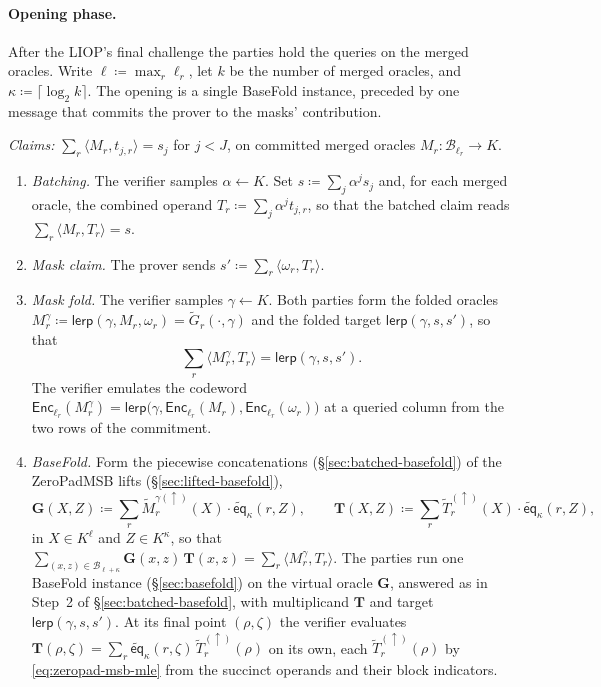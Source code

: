 \documentclass{article}
\theoremstyle{definition}
\newcommand*{\mle}{\widetilde}
\newcommand{\eq}{\mathsf{eq}}
\newcommand{\BB}{\mathcal{B}}
\begin{document}
\paragraph{Opening phase.}
After the LIOP's final challenge the parties hold the queries on the merged oracles. Write $\boldsymbol{\ell} \coloneqq \max_r \ell_r$, let $k$ be the number of merged oracles, and $\kappa \coloneqq \lceil \log_2 k \rceil$. The opening is a single BaseFold instance, preceded by one message that commits the prover to the masks' contribution.

\begin{protocol}
\label{prot:batched-zk-basefold}
\emph{Claims:} $\sum_r \langle M_r, t_{j, r} \rangle = s_j$ for $j < J$, on committed merged oracles $M_r \colon \BB_{\ell_r} \to K$.
\begin{enumerate}
\item \emph{Batching.} The verifier samples $\alpha \gets K$. Set $s \coloneqq \sum_j \alpha^j s_j$ and, for each merged oracle, the combined operand $T_r \coloneqq \sum_j \alpha^j t_{j, r}$, so that the batched claim reads $\sum_r \langle M_r, T_r \rangle = s$.
\item \emph{Mask claim.} The prover sends $s' \coloneqq \sum_r \langle \omega_r, T_r \rangle$.
\item \emph{Mask fold.} The verifier samples $\gamma \gets K$. Both parties form the folded oracles $M^\gamma_r \coloneqq \textsf{lerp}(\gamma, M_r, \omega_r) = \mle{G}_r(\cdot, \gamma)$ and the folded target $\textsf{lerp}(\gamma, s, s')$, so that
\[
  \sum_r \langle M^\gamma_r, T_r \rangle = \textsf{lerp}(\gamma, s, s').
\]
The verifier emulates the codeword $\textsf{Enc}_{\ell_r}(M^\gamma_r) = \textsf{lerp}\bigl(\gamma, \textsf{Enc}_{\ell_r}(M_r), \textsf{Enc}_{\ell_r}(\omega_r)\bigr)$ at a queried column from the two rows of the commitment.
\item \emph{BaseFold.} Form the piecewise concatenations (\S\ref{sec:batched-basefold}) of the ZeroPadMSB lifts (\S\ref{sec:lifted-basefold}),
\[
  \boldsymbol{G}(X, Z) \coloneqq \sum_r \mle{M}_r^{\gamma (\uparrow)}(X) \cdot \mle{\eq}_\kappa(r, Z), \qquad \boldsymbol{T}(X, Z) \coloneqq \sum_r \mle{T}_r^{(\uparrow)}(X) \cdot \mle{\eq}_\kappa(r, Z),
\]
in $X \in K^{\boldsymbol{\ell}}$ and $Z \in K^\kappa$, so that $\sum_{(x, z) \in \BB_{\boldsymbol{\ell} + \kappa}} \boldsymbol{G}(x, z)\, \boldsymbol{T}(x, z) = \sum_r \langle M^\gamma_r, T_r \rangle$. The parties run one BaseFold instance (\S\ref{sec:basefold}) on the virtual oracle $\boldsymbol{G}$, answered as in Step~2 of \S\ref{sec:batched-basefold}, with multiplicand $\boldsymbol{T}$ and target $\textsf{lerp}(\gamma, s, s')$. At its final point $(\rho, \zeta)$ the verifier evaluates $\boldsymbol{T}(\rho, \zeta) = \sum_r \mle{\eq}_\kappa(r, \zeta)\, \mle{T}_r^{(\uparrow)}(\rho)$ on its own, each $\mle{T}_r^{(\uparrow)}(\rho)$ by \eqref{eq:zeropad-msb-mle} from the succinct operands and their block indicators.
\end{enumerate}
\end{protocol}
\end{document}

